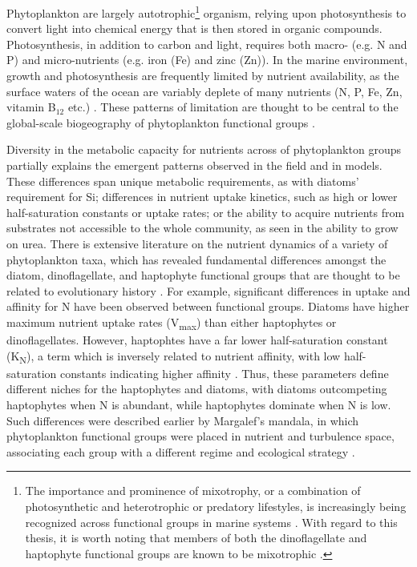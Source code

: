 Phytoplankton are largely autotrophic\footnote{The importance and prominence of mixotrophy, or a combination of photosynthetic and heterotrophic or predatory lifestyles, is increasingly being recognized across functional groups in marine systems \citep{Worden2015}.  With regard to this thesis, it is worth noting that members of both the dinoflagellate and haptophyte functional groups are known to be mixotrophic \citep{Unrein2014, Jeong2010}.} organism, relying upon photosynthesis to convert light into chemical energy that is then stored in organic compounds. Photosynthesis, in addition to carbon and light, requires both macro-  (e.g. N and P) and micro-nutrients (e.g. iron (Fe) and zinc (Zn)). In the marine environment, growth and photosynthesis are frequently limited by nutrient availability, as the surface waters of the ocean are variably deplete of many nutrients (N, P, Fe, Zn, vitamin B$_{12}$ etc.) \citep{Moore2004, Bertrand2007}. These patterns of limitation are thought to be central to the global-scale biogeography of phytoplankton functional groups \citep{Follows2007}.\par
 
Diversity in the metabolic capacity for nutrients across of phytoplankton groups partially explains the emergent patterns observed in the field and in models. These differences span unique metabolic requirements, as with diatoms' requirement for Si; differences in nutrient uptake kinetics, such as high or lower half-saturation constants or uptake rates; or the ability to acquire nutrients from substrates not accessible to the whole community, as seen in the ability to grow on urea. There is extensive literature on the nutrient dynamics of a variety of phytoplankton taxa, which has revealed fundamental differences amongst the diatom, dinoflagellate, and haptophyte functional groups that are thought to be related to evolutionary history \citep{Litchman2008}. For example, significant differences in uptake and affinity for N have been observed between functional groups. Diatoms have higher maximum nutrient uptake rates (V\textsubscript{max}) than either haptophytes or dinoflagellates. However, haptophtes have a far lower half-saturation constant (K\textsubscript{N}), a term which is inversely related to nutrient affinity, with low half-saturation constants indicating higher affinity \citep{Litchman2007}. Thus, these parameters define different niches for the haptophytes and diatoms, with diatoms outcompeting haptophytes when N is abundant, while haptophytes dominate when N is low. Such differences were described earlier by Margalef's mandala, in which phytoplankton functional groups were placed in nutrient and turbulence space, associating each group with a different regime and ecological strategy \citep{Margalef1978}. \par

